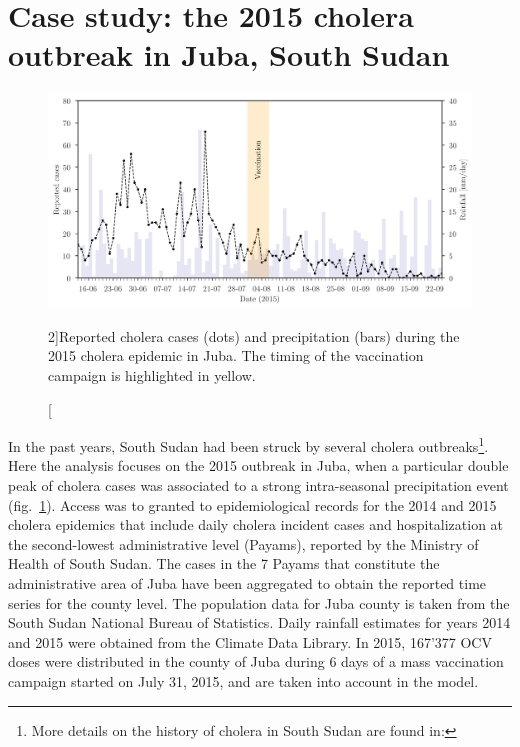 \section{Case study: the 2015 cholera outbreak in Juba, South Sudan}\label{sec:data sets}
\begin{figure}\centering
  \includegraphics{fig_cholera-rainfall/Lemaitre_ACTROP_2018_42_R1_fig2.png}
  \caption[Cholera cases and precipitation during the 2015 cholera epidemic in Juba][2\baselineskip]{Reported cholera cases (dots) and precipitation (bars) during the 2015 cholera epidemic in Juba. The timing of the vaccination campaign is highlighted in yellow.}\label{fig:report}
\end{figure}
In the past years, South Sudan had been struck by several cholera outbreaks\footnote{More details on the history of cholera in South Sudan are found in: }. Here the analysis focuses on the 2015 outbreak in Juba, when a particular double peak of cholera cases was associated to a strong intra-seasonal precipitation event (fig.~\ref{fig:report}). Access was to granted to epidemiological records for the 2014 and 2015 cholera epidemics that include daily cholera incident cases and hospitalization at the second-lowest administrative level (Payams), reported by the Ministry of Health of South Sudan. The cases in the 7 Payams that constitute the administrative area of Juba have been aggregated to obtain the reported time series for the county level. The population data for Juba county is taken from the South Sudan National Bureau of Statistics\cite[-4\baselineskip]{SSNBS:PopulationProjectionsSouth:2015}. Daily rainfall estimates for years 2014 and 2015 were obtained from the Climate Data Library\cite[-3.5\baselineskip][with a resolution of {0.1}$^\circ$, rainfall was averaged over the study area.]{IRI/LDEO:ClimateDataLibrary:2016}. In 2015, 167'377 OCV doses were distributed in the county of Juba during 6 days of a mass vaccination campaign started on July 31, 2015\cite[-3.2\baselineskip]{Abubakar:FirstUseGlobal:2015,Azman:EffectivenessOneDose:2016,Parker:AdaptingGlobalShortage:2017}, and are taken into account in the model.
\newpage
